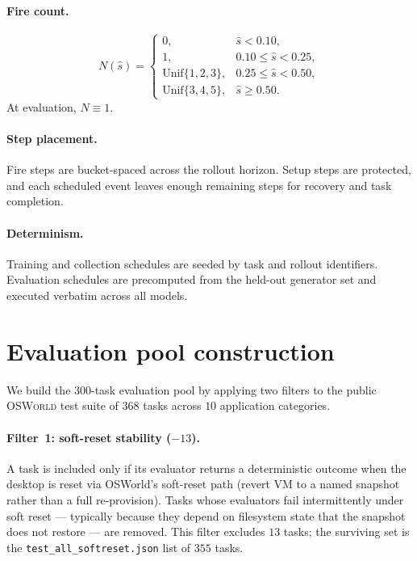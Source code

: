 \documentclass[11pt]{article}
\begin{document}
\paragraph{Fire count.}
\[
N(\hat{s}) =
\begin{cases}
0, & \hat{s}<0.10, \\
1, & 0.10 \le \hat{s} < 0.25, \\
\mathrm{Unif}\{1,2,3\}, & 0.25 \le \hat{s} < 0.50, \\
\mathrm{Unif}\{3,4,5\}, & \hat{s} \ge 0.50.
\end{cases}
\]
At evaluation, \(N\equiv 1\).

\paragraph{Step placement.}
Fire steps are bucket-spaced across the rollout horizon. Setup steps are protected, and each scheduled event leaves enough remaining steps for recovery and task completion.

\paragraph{Determinism.}
Training and collection schedules are seeded by task and rollout identifiers. Evaluation schedules are precomputed from the held-out generator set and executed verbatim across all models.

\section{Evaluation pool construction}
\label{app:eval-pool}

We build the 300-task evaluation pool by applying two filters to the
public \textsc{OSWorld} test suite of $368$ tasks across $10$ application categories.

\paragraph{Filter~1: soft-reset stability ($-13$).}
A task is included only if its evaluator returns a deterministic outcome
when the desktop is reset via OSWorld's soft-reset path (revert VM to a
named snapshot rather than a full re-provision). Tasks whose evaluators
fail intermittently under soft reset --- typically because they depend on
filesystem state that the snapshot does not restore --- are removed. This
filter excludes $13$ tasks; the surviving set is the
\texttt{test\_all\_softreset.json} list of $355$ tasks.
\end{document}
